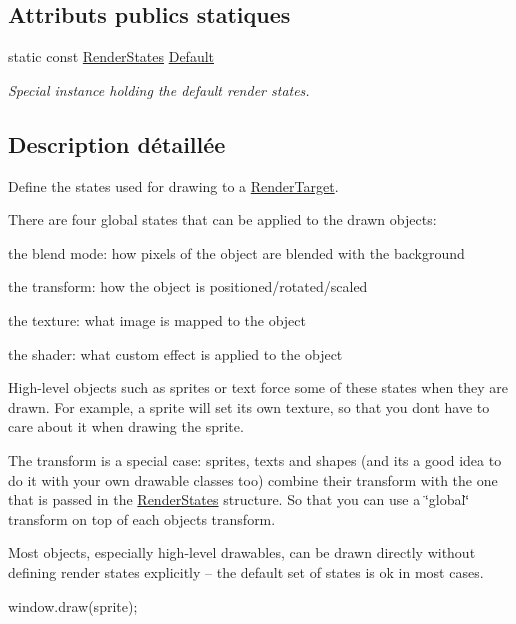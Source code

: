 \subsection*{Attributs publics statiques}
\begin{DoxyCompactItemize}
\item 
\mbox{\label{classsf_1_1RenderStates_ad29672df29f19ce50c3021d95f2bb062}} 
static const \hyperlink{classsf_1_1RenderStates}{Render\+States} \hyperlink{classsf_1_1RenderStates_ad29672df29f19ce50c3021d95f2bb062}{Default}
\begin{DoxyCompactList}\small\item\em Special instance holding the default render states. \end{DoxyCompactList}\end{DoxyCompactItemize}


\subsection{Description détaillée}
Define the states used for drawing to a \hyperlink{classsf_1_1RenderTarget}{Render\+Target}. 

There are four global states that can be applied to the drawn objects\+: \begin{DoxyItemize}
\item the blend mode\+: how pixels of the object are blended with the background \item the transform\+: how the object is positioned/rotated/scaled \item the texture\+: what image is mapped to the object \item the shader\+: what custom effect is applied to the object\end{DoxyItemize}
High-\/level objects such as sprites or text force some of these states when they are drawn. For example, a sprite will set its own texture, so that you don\textquotesingle{}t have to care about it when drawing the sprite.

The transform is a special case\+: sprites, texts and shapes (and it\textquotesingle{}s a good idea to do it with your own drawable classes too) combine their transform with the one that is passed in the \hyperlink{classsf_1_1RenderStates}{Render\+States} structure. So that you can use a \char`\"{}global\char`\"{} transform on top of each object\textquotesingle{}s transform.

Most objects, especially high-\/level drawables, can be drawn directly without defining render states explicitly -- the default set of states is ok in most cases. 
\begin{DoxyCode}
window.draw(sprite);
\end{DoxyCode}


